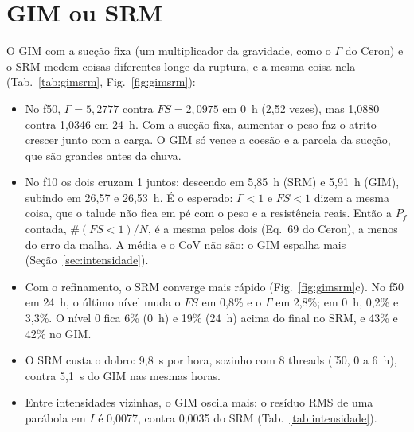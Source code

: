 \documentclass[11pt,a4paper]{article}
\begin{document}
\section{GIM ou SRM}\label{sec:gimsrm}
O GIM com a sucção fixa (um multiplicador da gravidade, como o $\Gamma$ do Ceron) e o SRM medem coisas diferentes longe da ruptura, e a mesma coisa
nela (Tab.~\ref{tab:gimsrm}, Fig.~\ref{fig:gimsrm}):
\begin{itemize}
\item No f50, $\Gamma = 5{,}2777$ contra $FS = 2{,}0975$ em 0~h (2,52 vezes), mas 1,0880 contra 1,0346 em 24~h. Com a
sucção fixa, aumentar o peso faz o atrito crescer junto com a carga. O GIM só vence a coesão e a parcela da sucção, que
são grandes antes da chuva.
\item No f10 os dois cruzam 1 juntos: descendo em 5,85~h (SRM) e 5,91~h (GIM), subindo em 26,57 e 26,53~h. É o
esperado: $\Gamma < 1$ e $FS < 1$ dizem a mesma coisa, que o talude não fica em pé com o peso e a resistência reais.
Então a $P_f$ contada, $\#(FS < 1)/N$, é a mesma pelos dois (Eq.~69 do Ceron), a menos do erro da malha. A média e o
CoV não são: o GIM espalha mais
(Seção~\ref{sec:intensidade}).
\item Com o refinamento, o SRM converge mais rápido (Fig.~\ref{fig:gimsrm}c). No f50 em 24~h, o último nível muda o $FS$
em 0,8\% e o $\Gamma$ em 2,8\%; em 0~h, 0,2\% e 3,3\%. O nível 0 fica 6\% (0~h) e 19\% (24~h) acima do final no SRM, e
43\% e 42\% no GIM.
\item O SRM custa o dobro: 9,8~s por hora, sozinho com 8 threads (f50, 0 a 6~h), contra 5,1~s do GIM nas mesmas horas.
\item Entre intensidades vizinhas, o GIM oscila mais: o resíduo RMS de uma parábola em $I$ é 0,0077, contra 0,0035 do SRM
(Tab.~\ref{tab:intensidade}).
\end{itemize}
\end{document}
